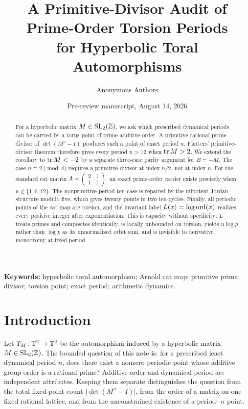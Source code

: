 \documentclass[11pt]{article}
\title{A Primitive-Divisor Audit of Prime-Order Torsion Periods\\
for Hyperbolic Toral Automorphisms}
\author{Anonymous Authors}
\date{Pre-review manuscript, August 14, 2026}
\theoremstyle{definition}
\theoremstyle{remark}
\begin{document}
\maketitle

\begin{abstract}
For a hyperbolic matrix \(M\in\mathrm{SL}_2(\mathbb{Z})\), we ask which prescribed
dynamical periods can be carried by a torus point of prime additive order.
A primitive rational prime divisor of \(\det(M^n-I)\) produces such a point
of exact period \(n\).  Flatters' primitive-divisor theorem therefore gives
every period \(n>12\) when \(\operatorname{tr} M>2\).  We extend the corollary to
\(\operatorname{tr} M<-2\) by a separate three-case parity argument for \(B=-M\).  The
case \(n\equiv2\pmod4\) requires a primitive divisor at index \(n/2\), not
at index \(n\).  For the standard cat matrix
\(A=\left(\begin{smallmatrix}2&1\\1&1\end{smallmatrix}\right)\), an exact
prime-order carrier exists precisely when \(n\notin\{1,6,12\}\).  The
nonprimitive period-ten case is repaired by the nilpotent Jordan structure
modulo five, which gives twenty points in two ten-cycles.  Finally, all
periodic points of the cat map are torsion, and the invariant label
\(L(x)=\log\operatorname{ord}(x)\) realizes every positive integer after exponentiation.
This is capacity without specificity: \(L\) treats primes and composites
identically, is locally unbounded on torsion, yields \(n\log p\) rather than
\(\log p\) as its unnormalized orbit sum, and is invisible to derivative
monodromy at fixed period.
\end{abstract}

\noindent\textbf{Keywords:} hyperbolic toral automorphism; Arnold cat map;
primitive prime divisor; torsion point; exact period; arithmetic dynamics.

\section{Introduction}
\label{sec:introduction}

Let \(T_M\colon\mathbb{T}^{2}\to\mathbb{T}^{2}\) be the automorphism induced by a hyperbolic
matrix \(M\in\mathrm{SL}_2(\mathbb{Z})\).  The bounded question of this note is:
for a prescribed least dynamical period \(n\), does there exist a nonzero
periodic point whose additive group order is a rational prime?  Additive
order and dynamical period are independent attributes.  Keeping them
separate distinguishes the question from the total fixed-point count
\(\lvert\det(M^n-I)\rvert\), from the order of a matrix on one fixed
rational lattice, and from the unconstrained existence of a period-
\(n\) point.
\end{document}
